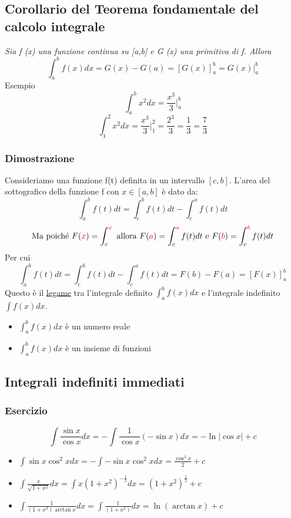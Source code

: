 \subsection{Corollario del Teorema fondamentale del calcolo integrale}
\textit{Sia f (x) una funzione continua su [a,b] e G (x) una primitiva di f. Allora}
\begin{equation*}
	\int^b_a f(x)dx=G(x)-G(a)=[G(x)]^b_a = G(x)\bigg|^b_a
\end{equation*}
Esempio
\begin{equation*}
	\int^b_a x^2 dx=\frac{x^3}{3}\bigg|^b_a
\end{equation*}
\begin{equation*}
	\int^2_1 x^2dx=\frac{x^3}{3}\bigg|^2_1=\frac{2^3}{3}=\frac{1}{3}=\frac{7}{3}
\end{equation*}
\subsubsection{Dimostrazione}
Consideriamo una funzione f(t) definita in un intervallo $[c,b]$. L'area del sottografico della funzione f con $x\in [a,b]$ è dato da:
\begin{equation*}
	\int^b_a f(t)dt=\int^b_c f(t)dt-\int^a_c f(t)dt
\end{equation*}
\begin{equation*}
	\text{Ma poiché } F({\color{red} x})=\int^{{\color{red}x}}_c \text{ allora } F({\color{red} a})=\int^{{\color{red}a}}_c f(t)dt \text{ e } F({\color{red} b})=\int^{{\color{red}b}}_c f(t)dt
\end{equation*}
Per cui
\begin{equation*}
	\int^b_a f(t)dt=\int^b_c f(t)dt-\int^a_c f(t)dt= F(b)-F(a)=[F(x)]^b_a
\end{equation*}
Questo è il \underline{legame} tra l'integrale definito $\int^b_a f(x)dx$ e l'integrale indefinito $\int f(x)dx$.
\begin{itemize}
	\item $\int^b_a f(x)dx$ è un numero reale
	\item $\int^b_a f(x)dx$ è un insieme di funzioni
\end{itemize}
\subsection{Integrali indefiniti immediati}
\subsubsection{Esercizio}
\begin{equation*}
	\int\frac{\sin x}{\cos x}dx=-\int \frac{1}{\cos x} (-\sin x)dx=-\ln |\cos x| + c
\end{equation*}
\begin{itemize}
	\item $\int \sin x \cos^2 x dx=-\int-\sin x \cos^2xdx=\frac{\cos^3x}{2}+c$
	\item $\int \frac{x}{\sqrt{1+x^2}}dx=\int x (1+x^2)^{-\frac{1}{2}}dx=(1+x^2)^\frac{1}{2}+c$
	\item $\int \frac{1}{(1+x^2)\arctan x}dx=\int \frac{1}{(1+x^2)}dx=\ln(\arctan x)+c$
\end{itemize}
